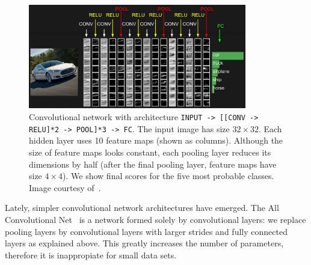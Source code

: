 \begin{figure}[h]
	\centering
	\includegraphics[width = 0.85\textwidth]{plots/convNetExample.jpeg}
	\caption[Convolutional network in action]{Convolutional network with architecture \texttt{INPUT -> [[CONV -> RELU]*2 -> POOL]*3 -> FC}. The input image has size $32\times 32$. Each hidden layer uses 10 feature maps (shown as columns). Although the size of feature maps looks constant, each pooling layer reduces its dimensions by half (after the final pooling layer, feature maps have size $4\times 4$). We show final scores for the five most probable classes. Image courtesy of~\cite{Karpathy2015}.}
	\label{fig:ConvNetExample}
\end{figure}

Lately, simpler convolutional network architectures have emerged. The All Convolutional Net~\cite{Springenberg2014} is a network formed solely by convolutional layers: we replace pooling layers by convolutional layers with larger strides and fully connected layers as explained above. This greatly increases the number of parameters, therefore it is inappropiate for small data sets.

